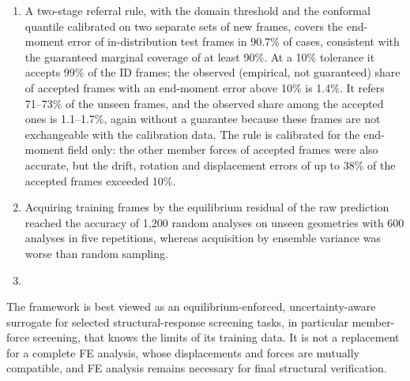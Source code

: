 \begin{enumerate}
\item A two-stage referral rule, with the domain threshold and the conformal quantile calibrated on two separate sets of new frames, covers the end-moment error of in-distribution test frames in 90.7\% of cases, consistent with the guaranteed marginal coverage of at least 90\%. At a 10\% tolerance it accepts 99\% of the ID frames; the observed (empirical, not guaranteed) share of accepted frames with an end-moment error above 10\% is 1.4\%. It refers 71--73\% of the unseen frames, and the observed share among the accepted ones is 1.1--1.7\%, again without a guarantee because these frames are not exchangeable with the calibration data. The rule is calibrated for the end-moment field only: the other member forces of accepted frames were also accurate, but the drift, rotation and displacement errors of up to 38\% of the accepted frames exceeded 10\%.
\item Acquiring training frames by the equilibrium residual of the raw prediction reached the accuracy of 1{,}200 random analyses on unseen geometries with 600 analyses in five repetitions, whereas acquisition by ensemble variance was worse than random sampling.
\item 
\end{enumerate}
The framework is best viewed as an equilibrium-enforced, uncertainty-aware surrogate for selected structural-response screening tasks, in particular member-force screening, that knows the limits of its training data. It is not a replacement for a complete FE analysis, whose displacements and forces are mutually compatible, and FE analysis remains necessary for final structural verification.
